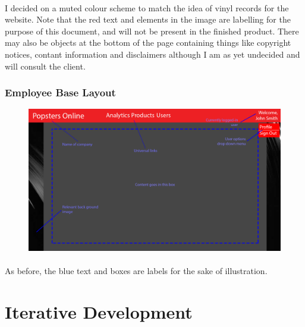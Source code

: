 ﻿\documentclass{article}
\begin{document}
    \paragraph{}
    I decided on a muted colour scheme to match the idea of vinyl records for the website.
    Note that the red text and elements in the image are labelling for the purpose of this document, and will not be present in the finished product.
    There may also be objects at the bottom of the page containing things like copyright notices, contant information and disclaimers although I am as yet undecided and will consult the client.
    
    \newpage
    \subsubsection{Employee Base Layout}
    \begin{figure}[H]
        \includegraphics[width=\textwidth]{employeeBasic.png}
        \centering
    \end{figure}
    \paragraph{}
    As before, the blue text and boxes are labels for the sake of illustration.
    \section{Iterative Development}
\end{document}
